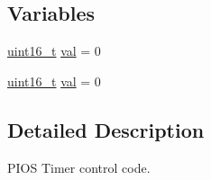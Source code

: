 \subsection*{Variables}
\begin{DoxyCompactItemize}
\item 
\hyperlink{stdint_8h_a273cf69d639a59973b6019625df33e30}{uint16\-\_\-t} \hyperlink{group___p_i_o_s___t_i_m_ga757344f09097232d715d55cbf9d61a43}{val} = 0
\item 
\hyperlink{stdint_8h_a273cf69d639a59973b6019625df33e30}{uint16\-\_\-t} \hyperlink{group___p_i_o_s___t_i_m_ga757344f09097232d715d55cbf9d61a43}{val} = 0
\end{DoxyCompactItemize}


\subsection{Detailed Description}
P\-I\-O\-S Timer control code. 

